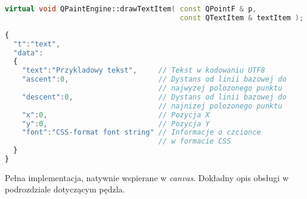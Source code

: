 \begin{lstlisting}[language=C++,numbers=none]
virtual void QPaintEngine::drawTextItem( const QPointF & p, 
                                         const QTextItem & textItem );
\end{lstlisting}
\begin{lstlisting}[language=JavaScript,numbers=none]
{
  "t":"text",
  "data":
  {
    "text":"Przykladowy tekst",     // Tekst w kodowaniu UTF8
    "ascent":0,                     // Dystans od linii bazowej do 
                                    // najwyzej polozonego punktu
    "descent":0,                    // Dystans od linii bazowej do 
                                    // najnizej polozonego punktu
    "x":0,                          // Pozycja X
    "y":0,                          // Pozycja Y
    "font":"CSS-format font string" // Informacje o czcionce 
                                    // w formacie CSS
  }
}
\end{lstlisting}

Pełna implementacja, natywnie wspierane w \emph{canvas}. Dokładny opis obsługi w podrozdziale dotyczącym pędzla.
